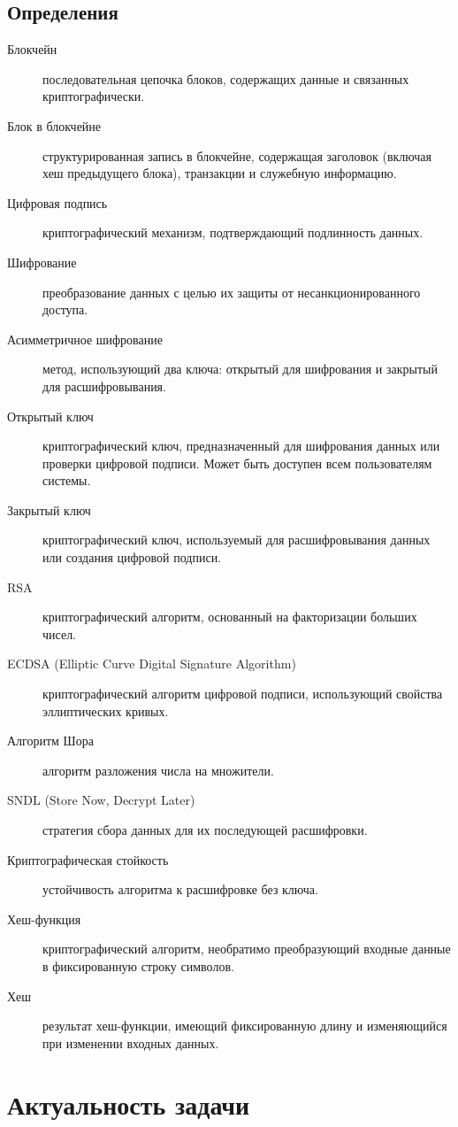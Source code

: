 \documentclass[a4paper]{article}
\begin{document}
\subsection{Определения}
\begin{description}
    \item[Блокчейн] последовательная цепочка блоков, содержащих данные и связанных криптографически.
    \item[Блок в блокчейне] структурированная запись в блокчейне, содержащая заголовок (включая хеш предыдущего блока), транзакции и служебную информацию.
    \item[Цифровая подпись] криптографический механизм, подтверждающий подлинность данных.
    \item[Шифрование] преобразование данных с целью их защиты от несанкционированного доступа.
    \item[Асимметричное шифрование] метод, использующий два ключа: открытый для шифрования и закрытый для расшифровывания.
    \item[Открытый ключ] криптографический ключ, предназначенный для шифрования данных или проверки цифровой подписи. Может быть доступен всем пользователям системы.  
    \item[Закрытый ключ] криптографический ключ, используемый для расшифровывания данных или создания цифровой подписи.
    \item[RSA] криптографический алгоритм, основанный на факторизации больших чисел.
    \item[ECDSA (Elliptic Curve Digital Signature Algorithm)] криптографический алгоритм цифровой подписи, использующий свойства эллиптических кривых.
    \item[Алгоритм Шора] алгоритм разложения числа на множители.
    \item[SNDL (Store Now, Decrypt Later)] стратегия сбора данных для их последующей расшифровки.
    \item[Криптографическая стойкость] устойчивость алгоритма к расшифровке без ключа.
    \item[Хеш-функция] криптографический алгоритм, необратимо преобразующий входные данные в фиксированную строку символов.
    \item[Хеш] результат хеш-функции, имеющий фиксированную длину и изменяющийся при изменении входных данных.
\end{description}

\section{Актуальность задачи}
\end{document}
